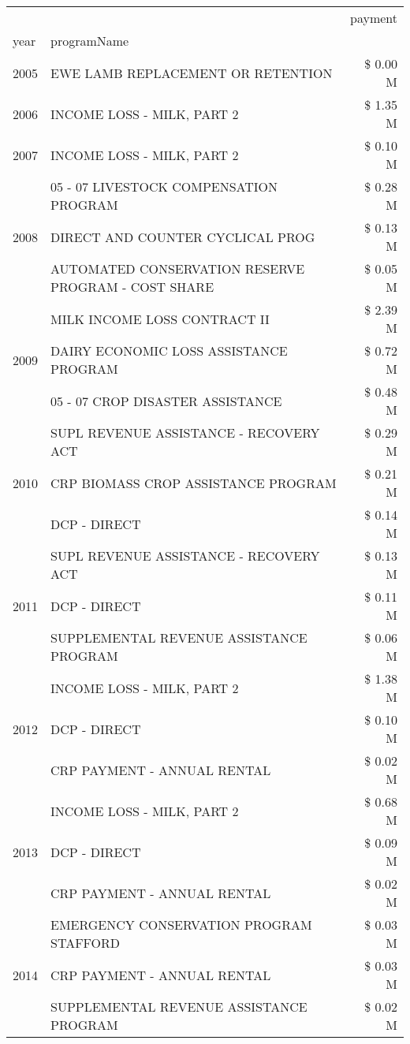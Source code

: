 \begin{tabular}{llr}
\toprule
 &  & payment \\
year & programName &  \\
\midrule
2005 & EWE LAMB REPLACEMENT OR RETENTION & \$ 0.00 M \\
\cline{1-3}
2006 & INCOME LOSS - MILK, PART 2 & \$ 1.35 M \\
\cline{1-3}
2007 & INCOME LOSS - MILK, PART 2 & \$ 0.10 M \\
\cline{1-3}
\multirow[t]{3}{*}{2008} & 05 - 07 LIVESTOCK COMPENSATION PROGRAM & \$ 0.28 M \\
 & DIRECT AND COUNTER CYCLICAL PROG & \$ 0.13 M \\
 & AUTOMATED CONSERVATION RESERVE PROGRAM - COST SHARE & \$ 0.05 M \\
\cline{1-3}
\multirow[t]{3}{*}{2009} & MILK INCOME LOSS CONTRACT II & \$ 2.39 M \\
 & DAIRY ECONOMIC LOSS ASSISTANCE PROGRAM & \$ 0.72 M \\
 & 05 - 07 CROP DISASTER ASSISTANCE & \$ 0.48 M \\
\cline{1-3}
\multirow[t]{3}{*}{2010} & SUPL REVENUE ASSISTANCE - RECOVERY ACT & \$ 0.29 M \\
 & CRP BIOMASS CROP ASSISTANCE PROGRAM & \$ 0.21 M \\
 & DCP - DIRECT & \$ 0.14 M \\
\cline{1-3}
\multirow[t]{3}{*}{2011} & SUPL REVENUE ASSISTANCE - RECOVERY ACT & \$ 0.13 M \\
 & DCP - DIRECT & \$ 0.11 M \\
 & SUPPLEMENTAL REVENUE ASSISTANCE PROGRAM & \$ 0.06 M \\
\cline{1-3}
\multirow[t]{3}{*}{2012} & INCOME LOSS - MILK, PART 2 & \$ 1.38 M \\
 & DCP - DIRECT & \$ 0.10 M \\
 & CRP PAYMENT - ANNUAL RENTAL & \$ 0.02 M \\
\cline{1-3}
\multirow[t]{3}{*}{2013} & INCOME LOSS - MILK, PART 2 & \$ 0.68 M \\
 & DCP - DIRECT & \$ 0.09 M \\
 & CRP PAYMENT - ANNUAL RENTAL & \$ 0.02 M \\
\cline{1-3}
\multirow[t]{3}{*}{2014} & EMERGENCY CONSERVATION PROGRAM STAFFORD & \$ 0.03 M \\
 & CRP PAYMENT - ANNUAL RENTAL & \$ 0.03 M \\
 & SUPPLEMENTAL REVENUE ASSISTANCE PROGRAM & \$ 0.02 M \\

\end{tabular}

